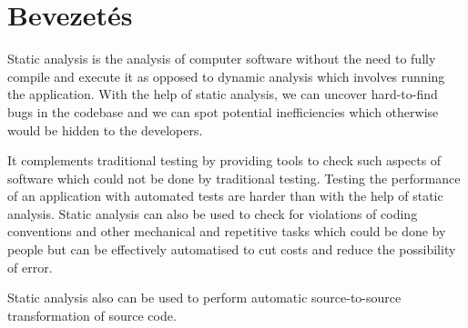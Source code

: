 \section{Bevezetés}
Static analysis is the analysis of computer software without the need to fully compile and execute it as opposed to dynamic analysis\cite{dynamic_analysis} which involves running the application. With the help of static analysis, we can uncover hard-to-find bugs in the codebase and we can spot potential inefficiencies which otherwise would be hidden to the developers. \medskip 
\par It complements traditional testing by providing tools to check such aspects of software which could not be done by traditional testing. Testing the performance of an application with automated tests are harder than with the help of static analysis. Static analysis can also be used to check for violations of coding conventions and other mechanical and repetitive tasks which could be done by people but can be effectively automatised to cut costs and reduce the possibility of error. \medskip 
\par Static analysis also can be used to perform automatic source-to-source transformation of source code.